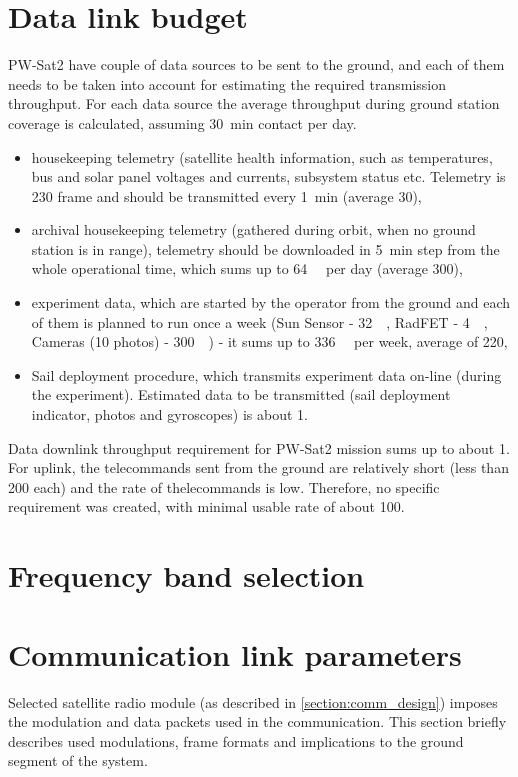 \section{Data link budget}
PW-Sat2 have couple of data sources to be sent to the ground, and each of them needs to be taken into account for estimating the required transmission throughput. For each data source the average throughput during ground station coverage is calculated, assuming \SI{30}{\minute} contact per day.
\begin{itemize}
    \item housekeeping telemetry (satellite health information, such as temperatures, bus and solar panel voltages and currents, subsystem status etc. Telemetry is \SI{230}{\byte} frame and should be transmitted every \SI{1}{\minute} (average \SI{30}{\bps}),
    \item archival housekeeping telemetry (gathered during orbit, when no ground station is in range), telemetry should be downloaded in \SI{5}{\minute} step from the whole operational time, which sums up to \SI{64}{\kilo\byte} per day (average \SI{300}{\bps}),
    \item experiment data, which are started by the operator from the ground and each of them is planned to run once a week (Sun Sensor -  \SI{32}{\kilo\byte}, RadFET - \SI{4}{\kilo\byte}, Cameras (10 photos) - \SI{300}{\kilo\byte}) - it sums up to \SI{336}{\kilo\byte} per week, average of \SI{220}{\bps},
    \item Sail deployment procedure, which transmits experiment data on-line (during the experiment). Estimated data to be transmitted (sail deployment indicator, photos and gyroscopes) is about \SI{1}{\kbps}.
\end{itemize}

Data downlink throughput requirement for PW-Sat2 mission sums up to about \SI{1}{\kbps}.
For uplink, the telecommands sent from the ground are relatively short (less than \SI{200}{\byte} each) and the rate of thelecommands is low. Therefore, no specific requirement was created, with minimal usable rate of about \SI{100}{\bps}.

\section{Frequency band selection}



\section{Communication link parameters}
Selected satellite radio module (as described in \autoref{section:comm_design}) imposes the modulation and data packets used in the communication. This section briefly describes used modulations, frame formats and implications to the ground segment of the system.

